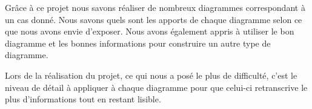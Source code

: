 \documentclass[11pt,a4paper]{article}
\begin{document}
Grâce à ce projet nous savons réaliser de nombreux diagrammes correspondant à un cas donné. Nous savons quels sont les apports de chaque diagramme selon ce que nous avons envie d'exposer. Nous avons également appris à utiliser le bon diagramme et les bonnes informations pour construire un autre type de diagramme.

Lors de la réalisation du projet, ce qui nous a posé le plus de difficulté, c'est le niveau de détail à appliquer à chaque diagramme pour que celui-ci retranscrive le plus d'informations tout en restant lisible.
\end{document}
